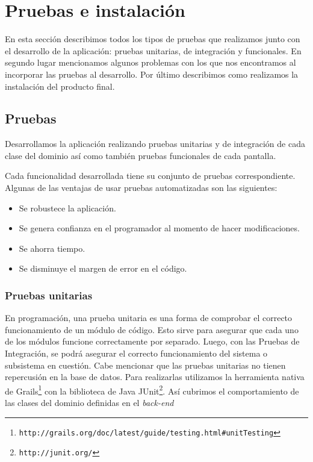 \section{Pruebas e instalación}
En esta sección describimos todos los tipos de pruebas que realizamos junto con el desarrollo de la aplicación: pruebas unitarias, de integración y funcionales. En segundo lugar mencionamos algunos problemas con los que nos encontramos al incorporar las pruebas al desarrollo. Por último describimos como realizamos la instalación del producto final.

\subsection{Pruebas}
Desarrollamos la aplicación realizando pruebas unitarias y de integración de cada clase del dominio así como también pruebas funcionales de cada pantalla.

Cada funcionalidad desarrollada tiene su conjunto de pruebas correspondiente. Algunas de las ventajas de usar pruebas automatizadas son las siguientes:

\begin{itemize}
\item Se robustece la aplicación.
\item Se genera confianza en el programador al momento de hacer modificaciones.
\item Se ahorra tiempo.
\item Se disminuye el margen de error en el código.
\end{itemize}

\subsubsection{Pruebas unitarias}
En programación, una prueba unitaria es una forma de comprobar el correcto funcionamiento de un módulo de código. Esto sirve para asegurar que cada uno de los módulos funcione correctamente por separado. Luego, con las Pruebas de Integración, se podrá asegurar el correcto funcionamiento del sistema o subsistema en cuestión. Cabe mencionar que las pruebas unitarias no tienen repercusión en la base de datos. Para realizarlas utilizamos la herramienta nativa de Grails\footnote{\texttt{http://grails.org/doc/latest/guide/testing.html\#unitTesting}} con la biblioteca de Java JUnit\footnote{\texttt{http://junit.org/}}. Así cubrimos el comportamiento de las clases del dominio definidas en el \textit{back-end}

